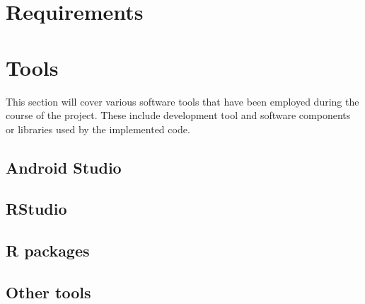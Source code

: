 \section{Requirements}


\section{Tools}
This section will cover various software tools that have been employed during the course of the project.
These include development tool and software components or libraries used by the implemented code.


\subsection{Android Studio}

\subsection{RStudio}

\subsection{R packages}

\subsection{Other tools}
